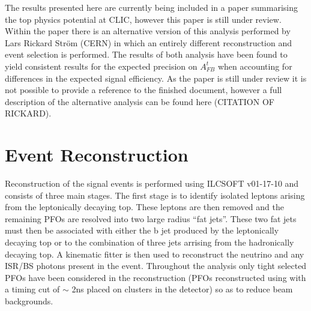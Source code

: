 The results presented here are currently being included in a paper summarising the top physics potential at \ac{CLIC}, however this paper is still under review. Within the paper there is an alternative version of this analysis performed by Lars Rickard Str{\"o}m (CERN) in which an entirely different reconstruction and event selection is performed. The results of both analysis have been found to yield consistent results for the expected precision on $A_{FB}^{t}$ when accounting for differences in the expected signal efficiency. As the paper is still under review it is not possible to provide a reference to the finished document, however a full description of the alternative analysis can be found here (CITATION OF RICKARD).


\section{Event Reconstruction}
Reconstruction of the signal events is performed using ILCSOFT v01-17-10 and consists of three main stages. The first stage is to identify isolated leptons arising from the leptonically decaying top. These leptons are then removed and the remaining PFOs are resolved into two large radius ``fat jets''. These two fat jets must then be associated with either the b jet produced by the leptonically decaying top or to the combination of three jets arrising from the hadronically decaying top. A kinematic fitter is then used to reconstruct the neutrino and any \ac{ISR}/\ac{BS} photons present in the event. Throughout the analysis only tight selected PFOs have been considered in the reconstruction (PFOs reconstructed using with a timing cut of $\sim$ 2ns placed on clusters in the detector\cite{cdrvol2}) so as to reduce beam backgrounds.

